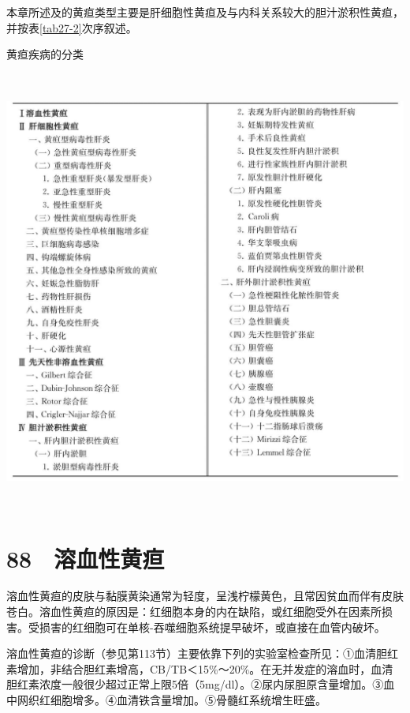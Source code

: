 本章所述及的黄疸类型主要是肝细胞性黄疸及与内科关系较大的胆汁淤积性黄疸，并按表\ref{tab27-2}次序叙述。

\begin{table}[htbp]
\centering
\caption{黄疸疾病的分类}
\label{tab27-2}
\includegraphics[width=6in,height=5.73958in]{./images/Image00151.jpg}
\end{table}

\protect\hypertarget{text00213.html}{}{}

\section{88　溶血性黄疸}

溶血性黄疸的皮肤与黏膜黄染通常为轻度，呈浅柠檬黄色，且常因贫血而伴有皮肤苍白。溶血性黄疸的原因是：红细胞本身的内在缺陷，或红细胞受外在因素所损害。受损害的红细胞可在单核-吞噬细胞系统提早破坏，或直接在血管内破坏。

溶血性黄疸的诊断（参见第113节）主要依靠下列的实验室检查所见：①血清胆红素增加，非结合胆红素增高，CB/TB＜15\%～20\%。在无并发症的溶血时，血清胆红素浓度一般很少超过正常上限5倍（5mg/dl）。②尿内尿胆原含量增加。③血中网织红细胞增多。④血清铁含量增加。⑤骨髓红系统增生旺盛。


